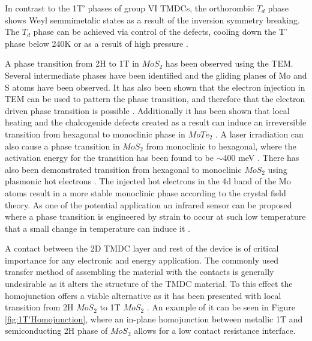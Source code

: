 In contrast to the 1T' phases of group VI TMDCs, the orthorombic $T_d$ phase shows Weyl semmimetalic states as a result of the inversion symmetry breaking. The $T_d$ phase can be achieved via control of the defects, cooling down the T' phase below 240K or as a result of high pressure \cite{Qi2016}. 

A phase transition from 2H to 1T in $MoS_2$ has been observed using the TEM. Several intermediate phases have been identified and the gliding planes of Mo and S atoms have been observed. It has also been shown that the electron injection in TEM can be used to pattern the phase transition, and therefore that the electron driven phase transition is possible \cite{Lin2014}. Additionally it has been shown that local heating and the chalcogenide defects created as a result can induce an irreversible transition from hexagonal to monoclinic phase in $MoTe_2$ \cite{Cho2015}. A laser irradiation can also cause a phase transition in $MoS_2$ from monoclinic to hexagonal, where the activation energy for the transition has been found to be $\sim$400 meV \cite{Guo2015}. There has also been demonstrated transition from hexagonal to monoclinic $MoS_2$ using plasmonic hot electrons \cite{Kang2014}. The injected hot electrons in the 4d band of the Mo atoms result in a more stable monoclinic phase according to the crystal field theory. As one of the potential application an infrared sensor can be proposed where a phase transition is engineered by strain to occur at such low temperature that a small change in temperature can induce it \cite{Song2015}.

A contact between the 2D TMDC layer and rest of the device is of critical importance for any electronic and energy application. The commonly used transfer method of assembling the material with the contacts is generally undesirable as it alters the structure of the TMDC material. To this effect the homojunction offers a viable alternative as it has been presented with local transition from 2H $MoS_2$ to 1T $MoS_2$ \cite{Kappera2014}. An example of it can be seen in Figure \ref{fig:1T'Homojunction}, where an in-plane homojunction between metallic 1T and semiconducting 2H phase of $MoS_2$ allows for a low contact resistance interface.

